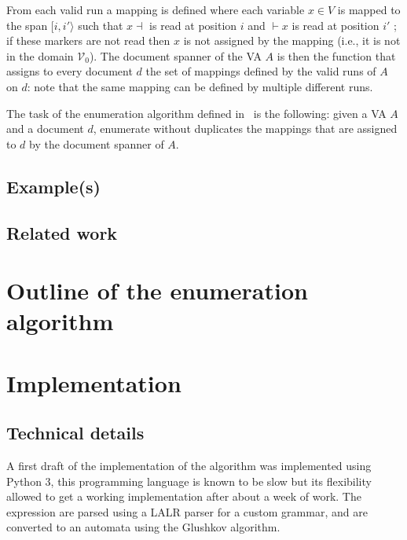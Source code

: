 \documentclass[12px]{article}
\begin{document}
        From each valid run a mapping is defined where each variable $x \in V$
        is mapped to the span $[i, i'\rangle$ such that $x \dashv$ is read at
        position $i$ and $\vdash x$ is read at position $i'$ ; if these markers
        are not read then $x$ is not assigned by the mapping (i.e., it is not
        in the domain $\mathcal{V}_0$). The document spanner of the VA $A$ is
        then the function that assigns to every document $d$ the set of
        mappings defined by the valid runs of $A$ on $d$: note that the same
        mapping can be defined by multiple different runs.

        The task of the enumeration algorithm defined in~\cite{ICDT19} is the
        following: given a VA $A$ and a document $d$, enumerate without
        duplicates the mappings that are assigned to $d$ by the document
        spanner of $A$.

    \subsection{Example(s)}
      

    \subsection{Related work}



  \section{Outline of the enumeration algorithm}


  \section{Implementation}


    \subsection{Technical details}

      A first draft of the implementation of the algorithm was implemented
      using Python 3, this programming language is known to be slow but its
      flexibility allowed to get a working implementation after about a week of
      work. The expression are parsed using a LALR parser for a custom grammar,
      and are converted to an automata using the Glushkov algorithm.
\end{document}
